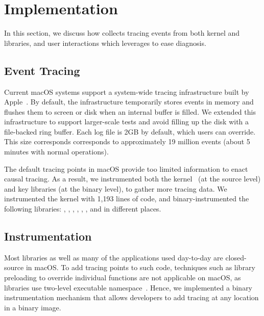 \section{Implementation}\label{sec:implementation}

In this section, we discuss how \xxx collects tracing events from both kernel
and libraries, and user interactions which \xxx leverages to ease diagnosis.

\subsection{Event Tracing}

Current macOS systems support a system-wide tracing infrastructure built by
Apple~\cite{linktotracetool}. By default, the infrastructure temporarily stores
events in memory and flushes them to screen or disk when an internal buffer
is filled. We extended this infrastructure to support larger-scale tests and
avoid filling up the disk with a file-backed ring buffer. Each log file is 2GB
by default, which users can override. This size corresponds corresponds to
approximately 19 million events (about 5 minutes with normal operations).

The default tracing points in macOS provide too limited information
to enact causal tracing. As a result, we instrumented both the
kernel~\cite{linkofxnusourcecode} (at the source level) and key libraries
(at the binary level), to gather more tracing data. We instrumented the kernel
with 1,193 lines of code, and binary-instrumented the following libraries:
, , ,
, , ,  and
 in \nlibchanges different places.



\subsection{Instrumentation}

Most libraries as well as many of the applications used day-to-day are
closed-source in macOS. To add tracing points to such code, techniques such as
library preloading to override individual functions are not applicable on macOS,
as libraries use two-level executable namespace~\cite{twolayernamespace}. Hence,
we implemented a binary instrumentation mechanism that allows developers to add
tracing at any location in a binary image.

